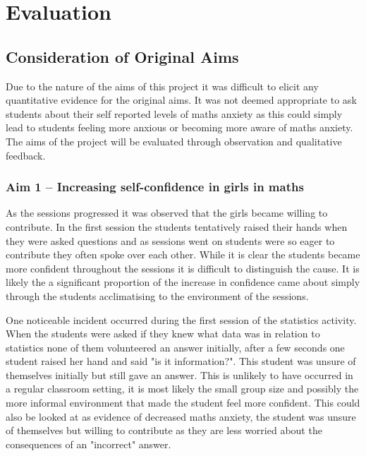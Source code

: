 \documentclass[11pt, a4paper, notitlepage]{article}
\begin{document}
\section{Evaluation}

\subsection{Consideration of Original Aims}
Due to the nature of the aims of this project it was difficult to elicit any quantitative evidence for the original aims. It was not deemed appropriate to ask students about their self reported levels of maths anxiety as this could simply lead to students feeling more anxious or becoming more aware of maths anxiety. The aims of the project will be evaluated through observation and qualitative feedback.

\subsubsection*{Aim 1 -- Increasing self-confidence in girls in maths}
As the sessions progressed it was observed that the girls became willing to contribute. In the first session the students tentatively raised their hands when they were asked questions and as sessions went on students were so eager to contribute they often spoke over each other. While it is clear the students became more confident throughout the sessions it is difficult to distinguish the cause. It is likely the a significant proportion of the increase in confidence came about simply through the students acclimatising to the environment of the sessions.
\par
One noticeable incident occurred during the first session of the statistics activity. When the students were asked if they knew what data was in relation to statistics none of them volunteered an answer initially, after a few seconds one student raised her hand and said "is it information?". This student was unsure of themselves initially but still gave an answer. This is unlikely to have occurred in a regular classroom setting, it is most likely the small group size and possibly the more informal environment that made the student feel more confident. This could also be looked at as evidence of decreased maths anxiety, the student was unsure of themselves but willing to contribute as they are less worried about the consequences of an "incorrect" answer.
\end{document}
